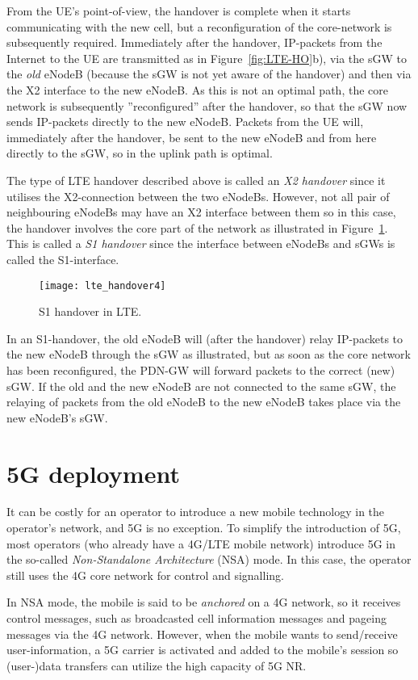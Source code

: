 From the UE's point-of-view, the handover is complete when it starts communicating with the new cell, but a reconfiguration of the core-network is subsequently required. Immediately after the handover, IP-packets from the Internet to the UE are transmitted as in Figure~\ref{fig:LTE-HO}b), \ie via the sGW to the \emph{old} eNodeB (because the sGW is not yet aware of the handover) and then via the X2 interface to the new eNodeB. As this is not an optimal path, the core network is subsequently ''reconfigured'' after the handover, so that the sGW now sends IP-packets directly to the new eNodeB. Packets from the UE will, immediately after the handover, be sent to the new eNodeB and from here directly to the sGW, so in the uplink path is optimal.

The type of LTE handover described above is called an \emph{X2 handover} since it utilises the X2-connection between the two eNodeBs. However, not all pair of neighbouring eNodeBs may have an X2 interface between them so in this case, the handover involves the core part of the network as illustrated in Figure~\ref{fig:LTE_Handover4}. This is called a \emph{S1 handover} since the interface between eNodeBs and sGWs is called the S1-interface.

\begin{figure}[htbp]
\centering
\texttt{[image: lte\_handover4]}
\caption{\label{fig:LTE_Handover4}S1 handover in LTE.}
\end{figure}

In an S1-handover, the old eNodeB will (after the handover) relay IP-packets to the new eNodeB through the sGW as illustrated, but as soon as the core network has been reconfigured, the PDN-GW will forward packets to the correct (new) sGW. If the old and the new eNodeB are not connected to the same sGW, the relaying of packets from the old eNodeB to the new eNodeB takes place via the new eNodeB's sGW.

\section{5G deployment}
It can be costly for an operator to introduce a new mobile technology in the operator's network, and 5G is no exception. To simplify the introduction of 5G, most operators (who already have a 4G/LTE mobile network) introduce 5G in the so-called \emph{Non-Standalone Architecture} (NSA) mode. In this case, the operator still uses the 4G core network for control and signalling. 

In NSA mode, the mobile is said to be \emph{anchored} on a 4G network, so it receives control messages, such as broadcasted cell information messages and pageing messages via the 4G network. However, when the mobile wants to send/receive user-information, a 5G carrier is activated and added to the mobile's session so (user-)data transfers can utilize the high capacity of 5G NR.

